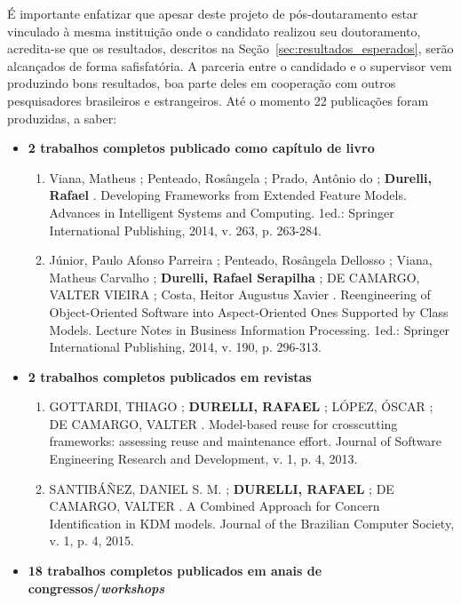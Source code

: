 \documentclass[12pt]{article}
\begin{document}
É importante enfatizar que apesar deste projeto de pós-doutaramento estar vinculado à mesma instituição onde o candidato realizou seu doutoramento, acredita-se que os resultados, descritos na Seção~\ref{sec:resultados_esperados}, serão alcançados de forma safisfatória. A parceria entre o candidado e o supervisor vem produzindo bons resultados, boa parte deles em cooperação com outros pesquisadores brasileiros e estrangeiros. Até o momento 22 publicações foram produzidas, a saber:

\begin{itemize}
	
	\item \textbf{2 trabalhos completos publicado como capítulo de livro}
		\begin{enumerate}
			
			\item Viana, Matheus ; Penteado, Rosângela ; Prado, Antônio do ; \textbf{Durelli, Rafael} . Developing Frameworks from Extended Feature Models. Advances in Intelligent Systems and Computing. 1ed.: Springer International Publishing, 2014, v. 263, p. 263-284.
			\item Júnior, Paulo Afonso Parreira ; Penteado, Rosângela Dellosso ; Viana, Matheus Carvalho ; \textbf{Durelli, Rafael Serapilha} ; DE CAMARGO, VALTER VIEIRA ; Costa, Heitor Augustus Xavier . Reengineering of Object-Oriented Software into Aspect-Oriented Ones Supported by Class Models. Lecture Notes in Business Information Processing. 1ed.: Springer International Publishing, 2014, v. 190, p. 296-313.
			
		\end{enumerate}
	
	\item \textbf{2 trabalhos completos publicados em revistas}
		\begin{enumerate}
			\item GOTTARDI, THIAGO ; \textbf{DURELLI, RAFAEL} ; LÓPEZ, ÓSCAR ; DE CAMARGO, VALTER . Model-based reuse for crosscutting frameworks: assessing reuse and maintenance effort. Journal of Software Engineering Research and Development, v. 1, p. 4, 2013.
			\item SANTIBÁÑEZ, DANIEL S. M. ; \textbf{DURELLI, RAFAEL} ; DE CAMARGO, VALTER . A Combined Approach for Concern Identification in KDM models. Journal of the Brazilian Computer Society, v. 1, p. 4, 2015.
		\end{enumerate}
	\item \textbf{18 trabalhos completos publicados em anais de congressos/\textit{workshops}}
	\begin{enumerate}
	    

\end{enumerate}
\end{itemize}
\end{document}
